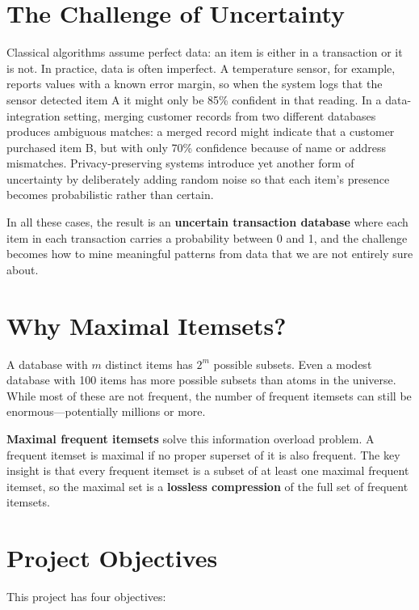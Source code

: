\documentclass[12pt,a4paper]{report}
\begin{document}
  \section{The Challenge of Uncertainty}

  Classical algorithms assume perfect data: an item is either in a transaction or it is not. In practice, data is often imperfect. A temperature sensor, for example, reports values with a known error margin, so when the system logs that the sensor detected item A it might only be 85\% confident in that reading. In a data-integration setting, merging customer records from two different databases produces ambiguous matches: a merged record might indicate that a customer purchased item B, but with only 70\% confidence because of name or address mismatches. Privacy-preserving systems introduce yet another form of uncertainty by deliberately adding random noise so that each item's presence becomes probabilistic rather than certain.

  In all these cases, the result is an \textbf{uncertain transaction database} where each item in each transaction carries a probability between 0 and 1, and the challenge becomes how to mine meaningful patterns from data that we are not entirely sure about.

  \section{Why Maximal Itemsets?}

  A database with $m$ distinct items has $2^m$ possible subsets. Even a modest database with 100 items has more possible subsets than atoms in the universe. While most of these are not frequent, the number of frequent itemsets can still be enormous---potentially millions or more.

  \textbf{Maximal frequent itemsets} solve this information overload problem. A frequent itemset is maximal if no proper superset of it is also frequent. The key insight is that every frequent itemset is a subset of at least one maximal frequent itemset, so the maximal set is a \textbf{lossless compression} of the full set of frequent itemsets.

  \section{Project Objectives}

  This project has four objectives:
\end{document}
